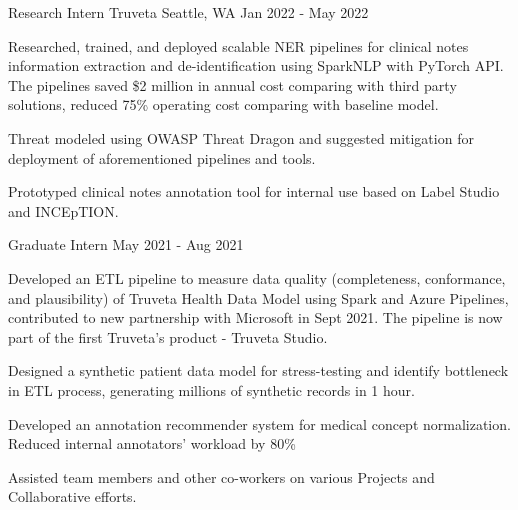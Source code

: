 \vspace{-4mm}
\vspace{-2mm}

\begin{cventries}

	\cventry
	{Research Intern}
	{Truveta}
	{Seattle, WA}
	{Jan 2022 - May 2022}
	{\begin{cvitems}
			\item {Researched, trained, and deployed scalable NER pipelines for clinical notes information extraction and de-identification using SparkNLP with PyTorch API. The pipelines saved \$2 million in annual cost comparing with third party solutions, reduced 75\% operating cost comparing with baseline model.}
			\item {Threat modeled using OWASP Threat Dragon and suggested mitigation for deployment of aforementioned pipelines and tools.}
			\item {Prototyped clinical notes annotation tool for internal use based on Label Studio and INCEpTION.}
		\end{cvitems}}

	\vspace{-2mm}

	\cventry
	{Graduate Intern}
	{}
	{}
	{May 2021 - Aug 2021}
	{\begin{cvitems}
			\item {Developed an ETL pipeline to measure data quality (completeness, conformance, and plausibility) of Truveta Health Data Model using Spark and Azure Pipelines, contributed to new partnership with Microsoft in Sept 2021. The pipeline is now part of the first Truveta's product - Truveta Studio.}
			\item {Designed a synthetic patient data model for stress-testing and identify bottleneck in ETL process, generating millions of synthetic records in 1 hour.}
			\item {Developed an annotation recommender system for medical concept normalization. Reduced internal annotators' workload by 80\%}
			\item {Assisted team members and other co-workers on various Projects and Collaborative efforts.}
		\end{cvitems}}


\end{cventries}
